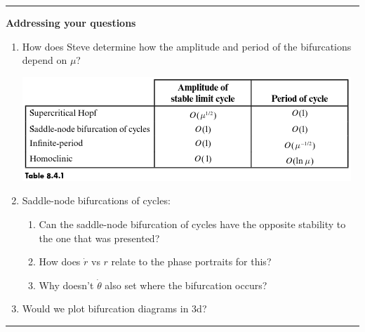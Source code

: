 \documentclass[12pt,letterpaper,noanswers]{exam}
\begin{document}
\vspace{0.2cm}
\hrule
\vspace{0.2cm}

\textbf{Addressing your questions}
\begin{enumerate}
    \item How does Steve determine how the amplitude and period of the bifurcations depend on $\mu$?
    
    \includegraphics[width=0.8\linewidth]{img/C20limitcyclescaling.png}
    \item Saddle-node bifurcations of cycles:
    \begin{enumerate}
        \item Can the saddle-node bifurcation of cycles have the opposite stability to the one that was presented?
    \item How does $\dot r$ vs $r$ relate to the phase portraits for this?
    \item Why doesn't $\dot\theta$ also set where the bifurcation occurs?
    \end{enumerate}
    \item Would we plot bifurcation diagrams in 3d?
\end{enumerate}

\vspace{0.2cm}
\hrule
\vspace{0.2cm}
\end{document}
